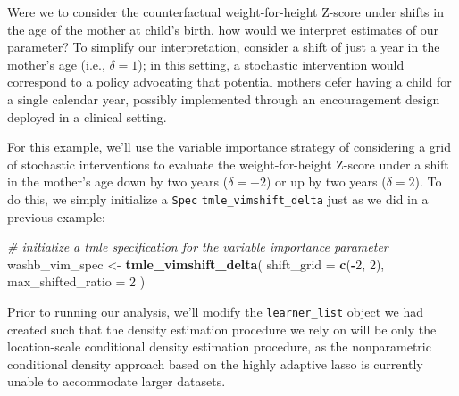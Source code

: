 \documentclass[12pt, krantz2,]{book}
\newenvironment{Shaded}{\begin{snugshade}}{\end{snugshade}}
\newcommand{\CommentTok}[1]{\textcolor[rgb]{0.56,0.35,0.01}{\textit{#1}}}
\newcommand{\DataTypeTok}[1]{\textcolor[rgb]{0.13,0.29,0.53}{#1}}
\newcommand{\DecValTok}[1]{\textcolor[rgb]{0.00,0.00,0.81}{#1}}
\newcommand{\KeywordTok}[1]{\textcolor[rgb]{0.13,0.29,0.53}{\textbf{#1}}}
\newcommand{\NormalTok}[1]{#1}
\newcommand{\OperatorTok}[1]{\textcolor[rgb]{0.81,0.36,0.00}{\textbf{#1}}}
\newcommand{\OtherTok}[1]{\textcolor[rgb]{0.56,0.35,0.01}{#1}}
\newcommand{\StringTok}[1]{\textcolor[rgb]{0.31,0.60,0.02}{#1}}
\theoremstyle{definition}
\theoremstyle{definition}
\theoremstyle{definition}
\newcommand{\1}{\mathbbm{1}}
\begin{document}
Were we to consider the counterfactual weight-for-height Z-score under shifts in
the age of the mother at child's birth, how would we interpret estimates of our
parameter? To simplify our interpretation, consider a shift of just a year in
the mother's age (i.e., \(\delta = 1\)); in this setting, a stochastic
intervention would correspond to a policy advocating that potential mothers
defer having a child for a single calendar year, possibly implemented through an
encouragement design deployed in a clinical setting.

For this example, we'll use the variable importance strategy of considering a
grid of stochastic interventions to evaluate the weight-for-height Z-score under
a shift in the mother's age down by two years (\(\delta = -2\)) or up by two years
(\(\delta = 2\)). To do this, we simply initialize a \texttt{Spec} \texttt{tmle\_vimshift\_delta}
just as we did in a previous example:

\begin{Shaded}
\begin{Highlighting}[]
\CommentTok{# initialize a tmle specification for the variable importance parameter}
\NormalTok{washb_vim_spec <-}\StringTok{ }\KeywordTok{tmle_vimshift_delta}\NormalTok{(}
  \DataTypeTok{shift_grid =} \KeywordTok{c}\NormalTok{(}\OperatorTok{-}\DecValTok{2}\NormalTok{, }\DecValTok{2}\NormalTok{),}
  \DataTypeTok{max_shifted_ratio =} \DecValTok{2}
\NormalTok{)}
\end{Highlighting}
\end{Shaded}

Prior to running our analysis, we'll modify the \texttt{learner\_list} object we had
created such that the density estimation procedure we rely on will be only the
location-scale conditional density estimation procedure, as the nonparametric
conditional density approach based on the highly adaptive lasso \citep{diaz2011super, benkeser2016hal, coyle2020hal9001, hejazi2020hal9001, hejazi2020haldensify}
is currently unable to accommodate larger datasets.

\begin{Shaded}
\end{Shaded}
\end{document}
